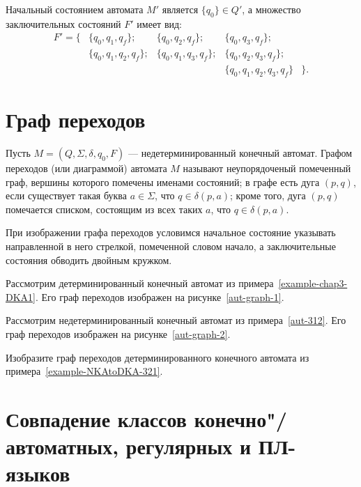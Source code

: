 \begin{myexample}


Начальный состоянием автомата $M'$ является $\{q_0\}\in Q'$, а множество заключительных состояний $F'$ имеет вид:
\[\begin{array}{rllll}
F' = \{
	& \{q_0,q_1,q_f\};     & \{q_0,q_2,q_f\};     & \{q_0,q_3,q_f\};&\\
	& \{q_0,q_1,q_2,q_f\}; & \{q_0,q_1,q_3,q_f\}; & \{q_0,q_2,q_3,q_f\};&\\
	& & & \{q_0,q_1,q_2,q_3,q_f \} & \}.
\end{array}\]
\end{myexample}

\section{Граф переходов}
\label{Chapter3Graph}
Пусть $M=(Q,\Sigma,\delta,q_0,F)$ --- недетерминированный конечный автомат. Графом переходов (или диаграммой) автомата $M$ называют неупорядоченый помеченный граф, вершины которого помечены именами состояний; в графе есть дуга $(p,q)$, если существует такая буква $a\in\Sigma$, что $q\in\delta(p,a)$; кроме того, дуга $(p,q)$ помечается списком, состоящим из всех таких $a$, что $q\in\delta(p,a)$.

При изображении графа переходов условимся начальное состояние указывать направленной в него стрелкой, помеченной словом начало, а заключительные состояния обводить двойным кружком.

\begin{myexample}
Рассмотрим детерминированный конечный автомат из примера~\ref{example-chap3-DKA1}. Его граф переходов изображен на рисунке~\ref{aut-graph-1}.

\end{myexample}

\begin{myexample}
Рассмотрим недетерминированный конечный автомат из примера~\ref{aut-312}. Его граф переходов изображен на рисунке~\ref{aut-graph-2}.

\end{myexample}

\begin{myproblem}
Изобразите граф переходов детерминированного конечного автомата из примера~\ref{example-NKAtoDKA-321}.
\end{myproblem}

\section{Совпадение классов конечно"/автоматных, регулярных и ПЛ-языков}
\label{Chapter3MathesFARL}

